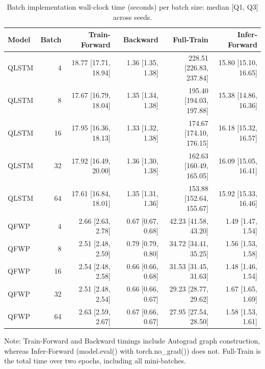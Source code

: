 \documentclass{article}
\begin{document}
\begin{table}[!htbp]
  \centering
  \small
  \caption{Batch implementation wall-clock time (seconds) per batch size: median [Q1, Q3] across seeds.}
  \label{tab:time_decomp}
  \begin{tabular*}{\textwidth}{@{\extracolsep{\fill}}lrrrrr}
    \toprule
    Model & Batch & Train-Forward & Backward & Full-Train & Infer-Forward \\
    \midrule
    QLSTM & 4 & 18.77 [17.71, 18.94] & 1.36 [1.35, 1.38] & 228.51 [226.83, 237.84] & 15.80 [15.10, 16.65] \\
    QLSTM & 8 & 17.67 [16.79, 18.04] & 1.35 [1.34, 1.38] & 195.40 [194.03, 197.88] & 15.38 [14.86, 16.36] \\
    QLSTM & 16 & 17.95 [16.36, 18.13] & 1.33 [1.32, 1.38] & 174.67 [174.10, 176.15] & 16.18 [15.32, 16.57] \\
    QLSTM & 32 & 17.92 [16.49, 20.00] & 1.36 [1.30, 1.38] & 162.63 [160.49, 165.05] & 16.09 [15.05, 16.41] \\
    QLSTM & 64 & 17.61 [16.84, 18.01] & 1.35 [1.31, 1.36] & 153.88 [152.64, 155.67] & 15.92 [15.33, 16.46] \\
    QFWP & 4 & 2.66 [2.63, 2.78] & 0.67 [0.67, 0.68] & 42.23 [41.58, 43.20] & 1.49 [1.47, 1.54] \\
    QFWP & 8 & 2.51 [2.48, 2.59] & 0.79 [0.79, 0.80] & 34.72 [34.41, 35.25] & 1.56 [1.53, 1.58] \\
    QFWP & 16 & 2.54 [2.48, 2.58] & 0.66 [0.66, 0.68] & 31.53 [31.45, 31.63] & 1.48 [1.46, 1.54] \\
    QFWP & 32 & 2.51 [2.48, 2.54] & 0.66 [0.66, 0.67] & 29.23 [28.77, 29.62] & 1.67 [1.65, 1.69] \\
    QFWP & 64 & 2.63 [2.59, 2.67] & 0.67 [0.66, 0.67] & 27.95 [27.54, 28.50] & 1.58 [1.53, 1.61] \\
    \bottomrule
  \end{tabular*}
  \vspace{1mm}

  \footnotesize
  Note: Train-Forward and Backward timings include Autograd graph construction, whereas Infer-Forward (model.eval() with torch.no\_grad()) does not. Full-Train is the total time over two epochs, including all mini-batches.
\end{table}
\end{document}
